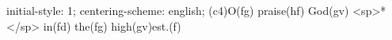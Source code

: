 initial-style: 1;
centering-scheme: english;
(c4)O(fg) praise(hf) God(gv) <sp>*</sp> in(fd) the(fg) high(gv)est.(f)
